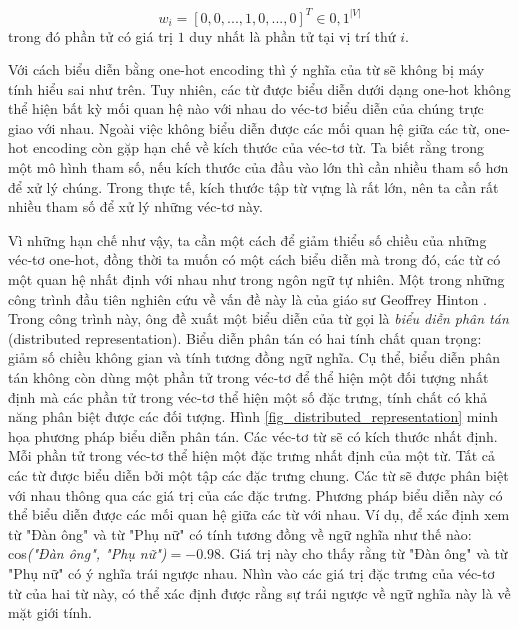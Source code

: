 \begin{equation} \label{onehotencoding}
	w_i = \left[ 0, 0, ..., 1,0,...,0 \right]^T \in {0,1}^{|V|}
\end{equation}
trong đó phần tử có giá trị $1$ duy nhất là phần tử tại vị trí thứ $i$.

Với cách biểu diễn bằng one-hot encoding thì ý nghĩa của từ sẽ không bị máy tính hiểu sai như trên. Tuy nhiên, các từ được biểu diễn dưới dạng one-hot không thể hiện bất kỳ mối quan hệ nào với nhau do véc-tơ biểu diễn của chúng trực giao với nhau. Ngoài việc không biểu diễn được các mối quan hệ giữa các từ, one-hot encoding còn gặp hạn chế về kích thước của véc-tơ từ. Ta biết rằng trong một mô hình tham số, nếu kích thước của đầu vào lớn thì cần nhiều tham số hơn để xử lý chúng. Trong thực tế, kích thước tập từ vựng là rất lớn, nên ta cần rất nhiều tham số để xử lý những véc-tơ này.

Vì những hạn chế như vậy, ta cần một cách để giảm thiểu số chiều của những véc-tơ one-hot, đồng thời ta muốn có một cách biểu diễn mà trong đó, các từ có một quan hệ nhất định với nhau như trong ngôn ngữ tự nhiên. Một trong những công trình đầu tiên nghiên cứu về vấn đề này là của giáo sư Geoffrey Hinton \cite{distributedrepHinton}. Trong công trình này, ông đề xuất một biểu diễn của từ gọi là \textit{biểu diễn phân tán} (distributed representation). Biểu diễn phân tán có hai tính chất quan trọng: giảm số chiều không gian và tính tương đồng ngữ nghĩa. Cụ thể, biểu diễn phân tán không còn dùng một phần tử trong véc-tơ để thể hiện một đối tượng nhất định mà các phần tử trong véc-tơ thể hiện một số đặc trưng, tính chất có khả năng phân biệt được các đối tượng. Hình \ref{fig_distributed_representation} minh họa phương pháp biểu diễn phân tán. Các véc-tơ từ sẽ có kích thước nhất định. Mỗi phần tử trong véc-tơ thể hiện một đặc trưng nhất định của một từ. Tất cả các từ được biểu diễn bởi một tập các đặc trưng chung. Các từ sẽ được phân biệt với nhau thông qua các giá trị của các đặc trưng. Phương pháp biểu diễn này có thể biểu diễn được các mối quan hệ giữa các từ với nhau. Ví dụ, để xác định xem từ "Đàn ông" và từ "Phụ nữ" có tính tương đồng về ngữ nghĩa như thế nào: cos\textit{("Đàn ông", "Phụ nữ")}$ = -0.98$. Giá trị này cho thấy rằng từ "Đàn ông" và từ "Phụ nữ" có ý nghĩa trái ngược nhau. Nhìn vào các giá trị đặc trưng của véc-tơ từ của hai từ này, có thể xác định được rằng sự trái ngược về ngữ nghĩa này là về mặt giới tính.

